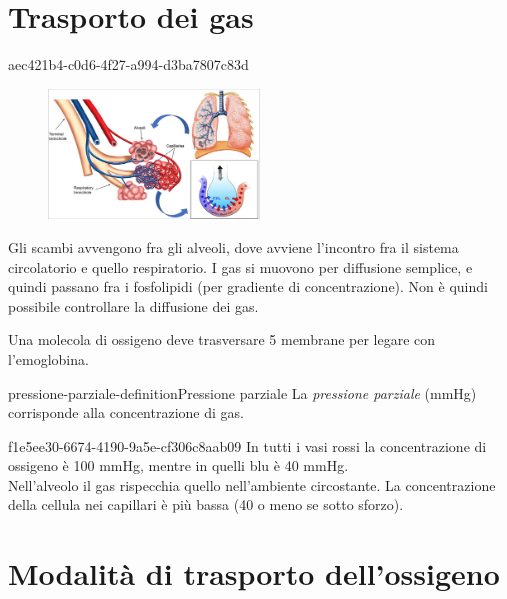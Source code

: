 \documentclass[preview]{standalone}
\begin{document}
\genpage

\section{Trasporto dei gas}

\begin{snippet}{aec421b4-c0d6-4f27-a994-d3ba7807c83d}
    \begin{figure}
        \includegraphics[width=0.5\textwidth]{./resources/gas_transport.png}
    \end{figure}
    
    Gli scambi avvengono fra gli alveoli, dove avviene l'incontro fra il sistema
    circolatorio e quello respiratorio.
    I gas si muovono per diffusione semplice, e quindi passano fra i fosfolipidi (per gradiente di concentrazione).
    Non è quindi possibile controllare la diffusione dei gas.
    
    Una molecola di ossigeno deve trasversare 5 membrane per legare con l'emoglobina.
    \wrapfill
\end{snippet}

\begin{snippetdefinition}{pressione-parziale-definition}{Pressione parziale}
    La \textit{pressione parziale} (mmHg) corrisponde alla concentrazione di gas.
\end{snippetdefinition}

\begin{snippet}{f1e5ee30-6674-4190-9a5e-cf306c8aab09}
    In tutti i vasi rossi la concentrazione di ossigeno è 100 mmHg, mentre in quelli blu è 40 mmHg.
    \\
    Nell'alveolo il gas rispecchia quello nell'ambiente circostante.
    La concentrazione della cellula nei capillari è più bassa (40 o meno se sotto sforzo).
\end{snippet}

\section{Modalità di trasporto dell'ossigeno}
\end{document}
